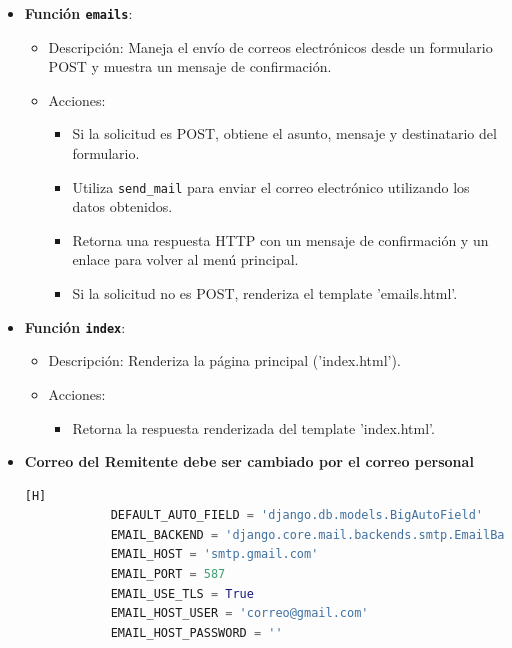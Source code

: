 \documentclass{article}
\begin{document}
\begin{itemize}
        \item \textbf{Función \texttt{emails}}:
            \begin{itemize}
                \item Descripción: Maneja el envío de correos electrónicos desde un formulario POST y muestra un mensaje de confirmación.
                \item Acciones:
                    \begin{itemize}
                        \item Si la solicitud es POST, obtiene el asunto, mensaje y destinatario del formulario.
                        \item Utiliza \texttt{send\_mail} para enviar el correo electrónico utilizando los datos obtenidos.
                        \item Retorna una respuesta HTTP con un mensaje de confirmación y un enlace para volver al menú principal.
                        \item Si la solicitud no es POST, renderiza el template 'emails.html'.
                    \end{itemize}
            \end{itemize}
            
        \item \textbf{Función \texttt{index}}:
            \begin{itemize}
                \item Descripción: Renderiza la página principal ('index.html').
                \item Acciones:
                    \begin{itemize}
                        \item Retorna la respuesta renderizada del template 'index.html'.
                    \end{itemize}
            \end{itemize}
        \item \textbf{Correo del Remitente debe ser cambiado por el correo personal}
        \begin{lstlisting}[language=Python,caption={Codigo de settings.py del proyecto}][H]
            DEFAULT_AUTO_FIELD = 'django.db.models.BigAutoField'
            EMAIL_BACKEND = 'django.core.mail.backends.smtp.EmailBackend'
            EMAIL_HOST = 'smtp.gmail.com'  
            EMAIL_PORT = 587
            EMAIL_USE_TLS = True
            EMAIL_HOST_USER = 'correo@gmail.com'
            EMAIL_HOST_PASSWORD = ''
        \end{lstlisting}
    \end{itemize}
    
\end{document}

